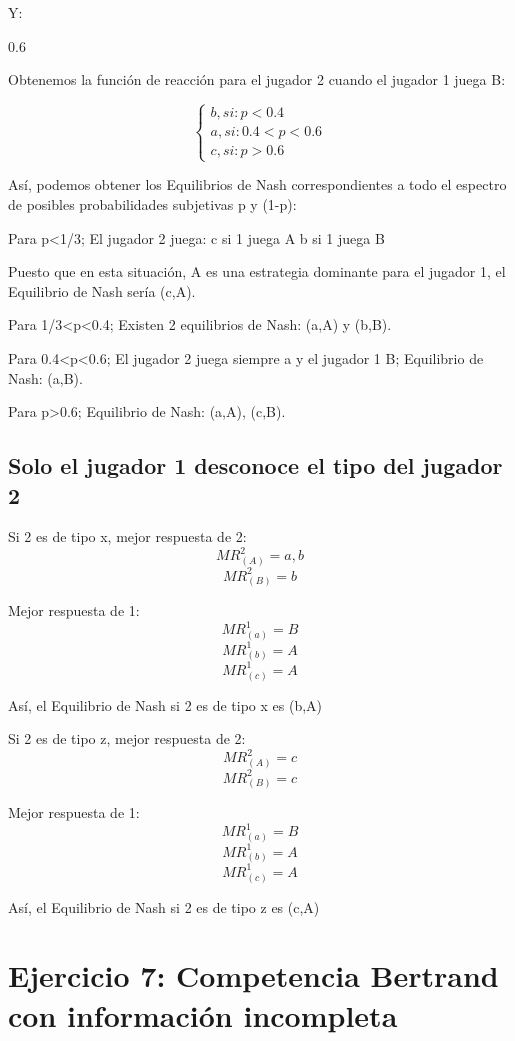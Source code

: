 \documentclass{article}
\begin{document}
Y:
\begin{Schunk}
\begin{Soutput}
[1] 0.6
\end{Soutput}
\end{Schunk}

Obtenemos la funci\'on de reacci\'on para el jugador 2 cuando el jugador 1 juega B:

$$\left\{ \begin{array}{c} b, si: p<0.4 \\ a, si: 0.4<p<0.6\\c, si: p>0.6\end{array}\right. $$

As\'i, podemos obtener los Equilibrios de Nash correspondientes a todo el espectro de posibles probabilidades subjetivas p y (1-p):

Para p<1/3; El jugador 2 juega:
  c si 1 juega A
  b si 1 juega B
  
Puesto que en esta situaci\'on, A es una estrategia dominante para el jugador 1, el Equilibrio de Nash ser\'ia (c,A).

Para 1/3<p<0.4; Existen 2 equilibrios de Nash: (a,A) y (b,B).

Para 0.4<p<0.6; El jugador 2 juega siempre a y el jugador 1 B; Equilibrio de Nash: (a,B).

Para p>0.6; Equilibrio de Nash: (a,A), (c,B).


\subsection{Solo el jugador 1 desconoce el tipo del jugador 2}

Si 2 es de tipo x, mejor respuesta de 2:
$$MR^2_{(A)}=a,b$$
$$MR^2_{(B)}=b$$

Mejor respuesta de 1:
$$MR^1_{(a)}=B$$
$$MR^1_{(b)}=A$$
$$MR^1_{(c)}=A$$

As\'i, el Equilibrio de Nash si 2 es de tipo x es (b,A)


Si 2 es de tipo z, mejor respuesta de 2:
$$MR^2_{(A)}=c$$
$$MR^2_{(B)}=c$$

Mejor respuesta de 1:
$$MR^1_{(a)}=B$$
$$MR^1_{(b)}=A$$
$$MR^1_{(c)}=A$$

As\'i, el Equilibrio de Nash si 2 es de tipo z es (c,A)

\section{Ejercicio 7: Competencia Bertrand con informaci\'on incompleta}
\end{document}
